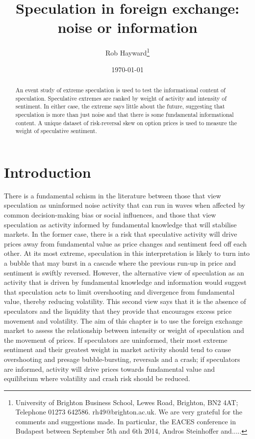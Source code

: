 \documentclass[12pt, a4paper, oneside]{article} %
\begin{document}
\title{Speculation in foreign exchange: noise or information}
\author{Rob Hayward\footnote{University of Brighton Business School, Lewes Road, Brighton, BN2 4AT; Telephone 01273 642586.  rh49@brighton.ac.uk.  We are very grateful for the comments and suggestions made.  In particular, the EACES conference in Budapest between September 5th and 6th 2014, Andros Steinhoffer and.....}} 
\date{\today}
\maketitle
\begin{abstract}
An event study of extreme speculation is used to test the informational content of speculation.  Speculative extremes are ranked by weight of activity and intensity of sentiment.  In either case, the extreme says little about the future, suggesting that speculation is more than just noise and that there is some fundamental informational content. A unique dataset of risk-reversal skew on option prices is used to measure the weight of speculative sentiment.   
\end{abstract}

\section{Introduction}

There is a fundamental schism in the literature between those that view speculation as uninformed noise activity that can run in waves when affected by common decision-making bias or social influences, and those that view speculation as activity informed by fundamental knowledge that will stabilise markets.  In the former case, there is a risk that speculative activity will drive prices away from fundamental value as price changes and sentiment feed off each other.  At its most extreme, speculation in this interpretation is likely to turn into a bubble that may burst in a cascade where the previous run-up in price and sentiment is swiftly reversed.  However, the alternative view of speculation as an activity that is driven by fundamental knowledge and information would suggest that speculation acts to limit overshooting and divergence from fundamental value, thereby reducing volatility.  This second view says that it is the absence of speculators and the liquidity that they provide that encourages excess price movement and volatility.  The aim of this chapter is to use the foreign exchange market to assess the relationship between intensity or weight of speculation and the movement of prices.  If speculators are uninformed, their most extreme sentiment and their greatest weight in market activity should tend to cause overshooting and presage bubble-bursting, reversals and a crash; if speculators are informed, activity will drive prices towards fundamental value and equilibrium where volatility and crash risk should be reduced.    
\end{document}
